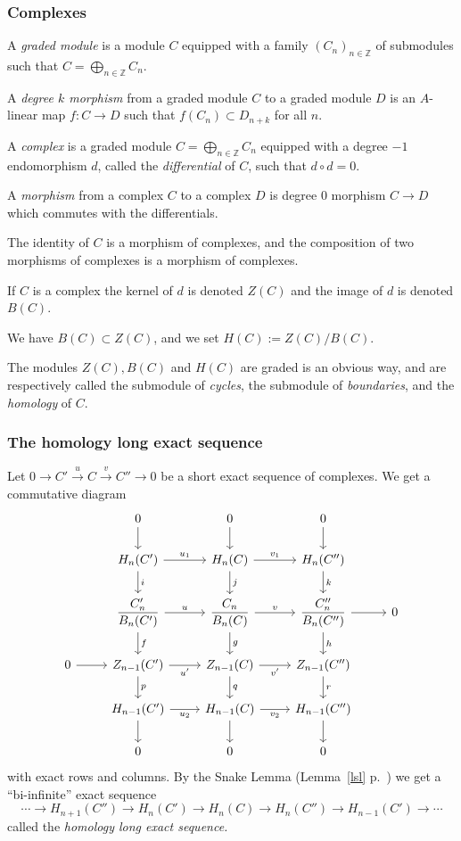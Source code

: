 \documentclass[parskip=half,fontsize=12pt]{scrartcl}%
\newcommand{\ds}{\displaystyle}
\newcommand{\xr}{\xrightarrow}
\begin{document}
\subsubsection{Complexes}%

A \emph{graded module} is a module $C$ equipped with a family $(C_n)_{n\in\mathbb Z}$ of submodules such that $C=\bigoplus_{n\in\mathbb Z}C_n$. 

A \emph{degree $k$ morphism} from a graded module $C$ to a graded module $D$ is an $A$-linear map $f:C\to D$ such that $f(C_n)\subset D_{n+k}$ for all $n$. 

A \emph{complex} is a graded module $C=\bigoplus_{n\in\mathbb Z}C_n$ equipped with a degree $-1$ endomorphism $d$, called the \emph{differential} of $C$, such that $d\circ d=0$. 

A \emph{morphism} from a complex $C$ to a complex $D$ is degree $0$ morphism $C\to D$ which commutes with the differentials. 

The identity of $C$ is a morphism of complexes, and the composition of two morphisms of complexes is a morphism of complexes. 

If $C$ is a complex the kernel of $d$ is denoted $Z(C)$ and the image of $d$ is denoted $B(C)$. 

We have $B(C)\subset Z(C)$, and we set $H(C):=Z(C)/B(C)$. 

The modules $Z(C),B(C)$ and $H(C)$ are graded is an obvious way, and are respectively called the submodule of \emph{cycles}, the submodule of \emph{boundaries}, and the \emph{homology} of $C$.



\subsubsection{The homology long exact sequence}\label{hles}%

Let $0\to C'\xr uC\xr vC''\to0$ be a short exact sequence of complexes. We get a commutative diagram 
$$
\begin{tikzcd}
&0\ar{d}&0\ar{d}&0\ar{d}\\ 
&H_n(C')\ar["u_1"]{r}\ar["i"]{d}&H_n(C)\ar["v_1"]{r}\ar["j"]{d}&H_n(C'')\ar["k"]{d}\\ 
&\ds\frac{C'_n}{B_n(C')}\ar["u"]{r}\ar["f"]{d}&\ds\frac{C_n}{B_n(C)}\ar["v"]{r}\ar["g"]{d}&\ds\frac{C''_n}{B_n(C'')}\ar["h"]{d}\ar{r}&0\\ 
0\ar{r}&Z_{n-1}(C')\ar["u'"']{r}\ar["p"]{d}&Z_{n-1}(C)\ar["v'"']{r}\ar["q"]{d}&Z_{n-1}(C'')\ar["r"]{d}\\ 
&H_{n-1}(C')\ar["u_2"']{r}\ar{d}&H_{n-1}(C)\ar["v_2"']{r}\ar{d}&H_{n-1}(C'')\ar{d}\\ 
&0&0&0
\end{tikzcd}
$$ 
with exact rows and columns. By the Snake Lemma (Lemma~\ref{lsl} p.~\pageref{lsl}) we get a ``bi-infinite'' exact sequence 
$$
\cdots\to H_{n+1}(C'')\to H_n(C')\to H_n(C)\to H_n(C'')\to H_{n-1}(C')\to\cdots
$$ 
called the \emph{homology long exact sequence.}
\end{document}
